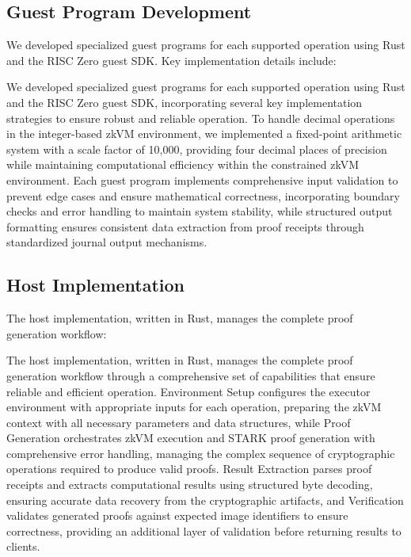 \documentclass[11pt]{article}
\begin{document}
\subsection{Guest Program Development}

We developed specialized guest programs for each supported operation using Rust and the RISC Zero guest SDK. Key implementation details include:

We developed specialized guest programs for each supported operation using Rust and the RISC Zero guest SDK, incorporating several key implementation strategies to ensure robust and reliable operation. To handle decimal operations in the integer-based zkVM environment, we implemented a fixed-point arithmetic system with a scale factor of 10,000, providing four decimal places of precision while maintaining computational efficiency within the constrained zkVM environment. Each guest program implements comprehensive input validation to prevent edge cases and ensure mathematical correctness, incorporating boundary checks and error handling to maintain system stability, while structured output formatting ensures consistent data extraction from proof receipts through standardized journal output mechanisms.

\subsection{Host Implementation}

The host implementation, written in Rust, manages the complete proof generation workflow:

The host implementation, written in Rust, manages the complete proof generation workflow through a comprehensive set of capabilities that ensure reliable and efficient operation. Environment Setup configures the executor environment with appropriate inputs for each operation, preparing the zkVM context with all necessary parameters and data structures, while Proof Generation orchestrates zkVM execution and STARK proof generation with comprehensive error handling, managing the complex sequence of cryptographic operations required to produce valid proofs. Result Extraction parses proof receipts and extracts computational results using structured byte decoding, ensuring accurate data recovery from the cryptographic artifacts, and Verification validates generated proofs against expected image identifiers to ensure correctness, providing an additional layer of validation before returning results to clients.
\end{document}
